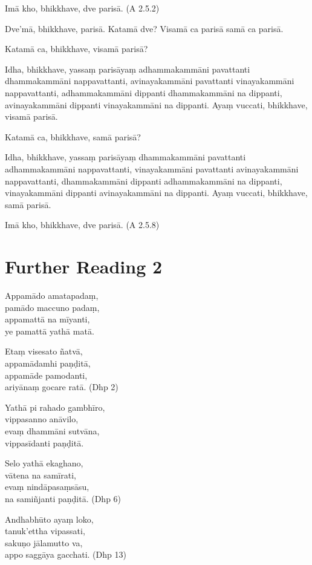 Imā kho, bhikkhave, dve parisā. \hfill(A 2.5.2)

Dve’mā, bhikkhave, parisā. Katamā dve? Visamā ca parisā samā ca parisā.

Katamā ca, bhikkhave, visamā parisā?

Idha, bhikkhave, yassaṃ parisāyaṃ adhammakammāni pavattanti dhammakammāni nappavattanti, avinayakammāni pavattanti vinayakammāni nappavattanti, adhammakammāni dippanti dhammakammāni na dippanti, avinayakammāni dippanti vinayakammāni na dippanti. Ayaṃ vuccati, bhikkhave, visamā parisā.

Katamā ca, bhikkhave, samā parisā?

Idha, bhikkhave, yassaṃ parisāyaṃ dhammakammāni pavattanti adhammakammāni nappavattanti, vinayakammāni pavattanti avinayakammāni nappavattanti, dhammakammāni dippanti adhammakammāni na dippanti, vinayakammāni dippanti avinayakammāni na dippanti. Ayaṃ vuccati, bhikkhave, samā parisā.

Imā kho, bhikkhave, dve parisā. \hfill(A 2.5.8)

\section*{Further Reading 2}

Appamādo amatapadaṃ,\\
pamādo maccuno padaṃ,\\
appamattā na mīyanti,\\
ye pamattā yathā matā.

Etaṃ visesato ñatvā,\\
appamādamhi paṇḍitā,\\
appamāde pamodanti,\\
ariyānaṃ gocare ratā. \hfill(Dhp 2)

Yathā pi rahado gambhīro,\\
vippasanno anāvilo,\\
evaṃ dhammāni sutvāna,\\
vippasīdanti paṇḍitā.

Selo yathā ekaghano,\\
vātena na samīrati,\\
evaṃ nindāpasaṃsāsu,\\
na samiñjanti paṇḍitā. \hfill(Dhp 6)

Andhabhūto ayaṃ loko,\\
tanuk’ettha vipassati,\\
sakuṇo jālamutto va,\\
appo saggāya gacchati. \hfill(Dhp 13)

